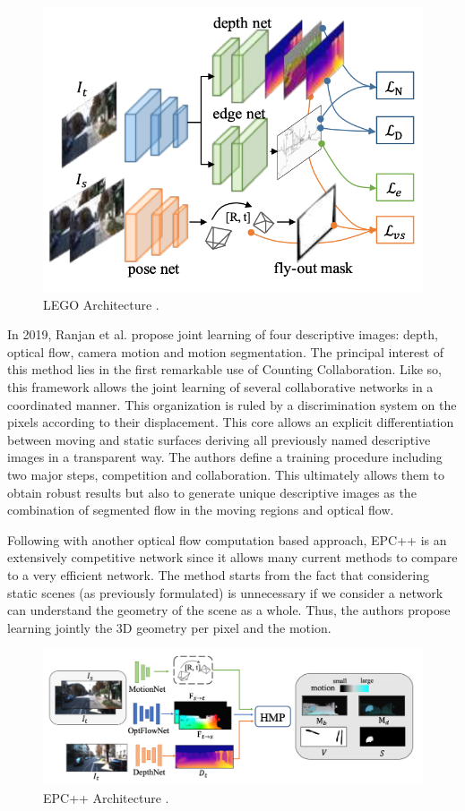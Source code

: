 \begin{figure}[h]
	\centering
	\includegraphics[width=0.4\linewidth]{Figures/SOA/yang2018illu}
	\caption[LEGO Architecture.]{LEGO Architecture \cite{yang2018lego}.}
	\label{yang2018illu}
\end{figure}


In 2019, Ranjan et al. \cite{ranjan2019competitive} propose joint learning of four descriptive images: depth, optical flow, camera motion and motion segmentation. The principal interest of this method lies in the first remarkable use of Counting Collaboration. Like so, this framework allows the joint learning of several collaborative networks in a coordinated manner. This organization is ruled by a discrimination system on the pixels according to their displacement. This core allows an explicit differentiation between moving and static surfaces deriving all previously named descriptive images in a transparent way. The authors define a training procedure including two major steps, competition and collaboration. This ultimately allows them to obtain robust results but also to generate unique descriptive images as the combination of segmented flow in the moving regions and optical flow. 


Following with another optical flow computation based approach, EPC++ \cite{luo2019every} is an extensively competitive network since it allows many current methods to compare to a very efficient network. The method starts from the fact that considering static scenes (as previously formulated) is unnecessary if we consider a network can understand the geometry of the scene as a whole. Thus, the authors propose learning jointly the 3D geometry per pixel and the motion. 

\begin{figure}[h]
	\centering
	\includegraphics[width=0.8\linewidth]{Figures/SOA/illuepc++}
	\caption[EPC++ Architecture.]{EPC++ Architecture \cite{luo2019every}.}
	\label{illuepc}
\end{figure}


